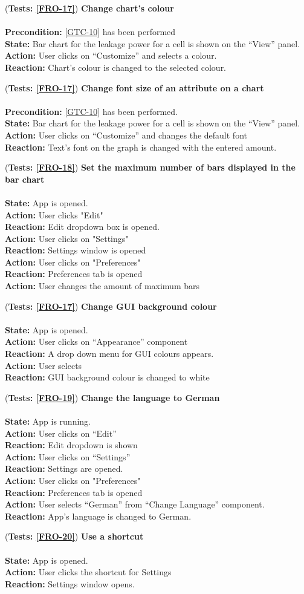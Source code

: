 \documentclass[10pt,a4paper]{report}
\newcommand{\precondition}[1]{
    \textbf{Precondition: } #1 \leavevmode \\
}
\newcommand{\action}[1]{
    \textbf{Action: } #1 \leavevmode \\
}
\newcommand{\state}[1]{
    \textbf{State: } #1 \leavevmode \\
}
\newcommand{\reaction}[1]{
    \textbf{Reaction: } #1 \leavevmode \\
}
\newcommand{\GTCODescription}[2]{
    (\textbf{Tests: #1}) \textbf{#2} \leavevmode \\
}
\begin{document}
\begin{GTCO}
    
    \item \GTCODescription{\ref{FRO-17}}{Change chart’s colour} \leavevmode \\ \precondition{\ref{GTC-10} has been performed}\state{Bar chart for the leakage power for a cell is shown on the “View” panel.}\action{User clicks on “Customize” and selects a colour.}\reaction{Chart’s colour is changed to the selected colour.}
    
    \item \GTCODescription{\ref{FRO-17}}{Change font size of an attribute on a chart} \leavevmode \\ \precondition{\ref{GTC-10} has been performed.}\state{Bar chart for the leakage power for a cell is shown on the “View” panel.}\action{User clicks on “Customize” and changes the default font }\reaction{Text’s font on the graph is changed with the entered amount.}
    
    \item \GTCODescription{\ref{FRO-18}}{Set the maximum number of bars displayed in the bar chart} \leavevmode \\ \state{App is opened.}\action{User clicks "Edit"}\reaction{Edit dropdown box is opened.}
    \action{User clicks on "Settings"}
    \reaction{Settings window is opened}\action{User clicks on "Preferences"} \reaction{Preferences tab is opened}\action{User changes the amount of maximum bars}
    
    
    \item \GTCODescription{\ref{FRO-17}}{Change GUI background colour} \leavevmode \\ \state{App is opened.}\action{User clicks on “Appearance” component}\reaction{A drop down menu for GUI colours appears.}
    \action{User selects}
    \reaction{GUI background colour is changed to white}
    
    \item \GTCODescription{\ref{FRO-19}}{Change the language to German} \leavevmode \\ \state{App is running.}\action{User clicks on “Edit”}\reaction{Edit dropdown is shown}
    \action{User clicks on “Settings”}\reaction{Settings are opened.}\action{User clicks on "Preferences"}\reaction{Preferences tab is opened}\action{User selects “German” from “Change Language” component.}\reaction{App’s language is changed to German.}
    
    
    \item \GTCODescription{\ref{FRO-20}}{Use a shortcut} \leavevmode \\ \state{App is opened.} \action{User clicks the shortcut for Settings}\reaction{Settings window opens.}
    

\end{GTCO}
\end{document}
